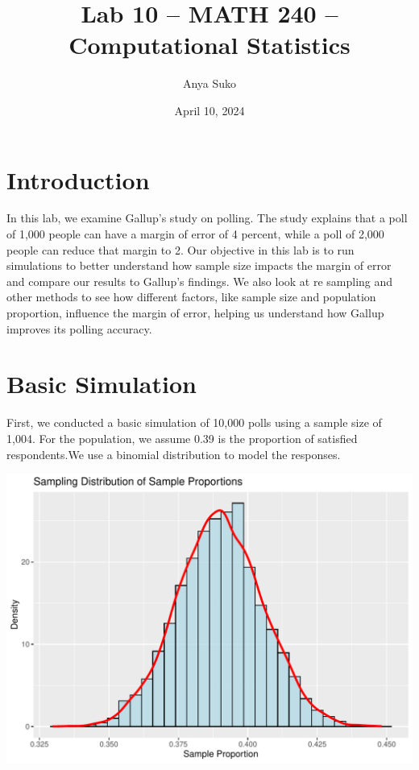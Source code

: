 \documentclass{article}\usepackage[]{graphicx}\usepackage[]{xcolor}
\newenvironment{Figure}
  {\par\medskip\noindent\minipage{\linewidth}}
  {\endminipage\par\medskip}
\begin{document}
\vspace{-1in}
\title{Lab 10 -- MATH 240 -- Computational Statistics}

\author{
  Anya Suko\\
}

\date{April 10, 2024}

\maketitle

\begin{multicols}{2}

\section{Introduction}
In this lab, we examine Gallup's study on polling. The study explains that a poll of 1,000 people can have a margin of error of 4 percent, while a poll of 2,000 people can reduce that margin to 2. Our objective in this lab is to run simulations to better understand how sample size impacts the margin of error and compare our results to Gallup's findings. We also look at re sampling and other methods to see how different factors, like sample size and population proportion, influence the margin of error, helping us understand how Gallup improves its polling accuracy. 

\section{Basic Simulation}
First, we conducted a basic simulation of 10,000 polls using a sample size of 1,004. For the population, we assume 0.39 is the proportion of satisfied respondents.We use a binomial distribution to model the responses.

\begin{Figure}
\includegraphics[width=\linewidth]{plot 1.pdf}
\end{Figure}


\end{multicols}
\end{document}

